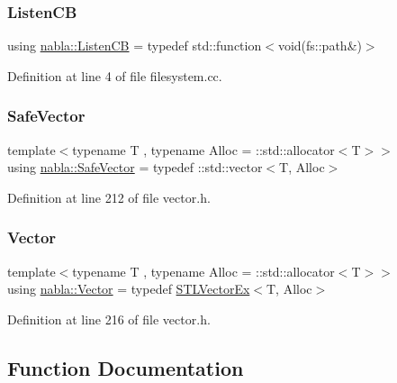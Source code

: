\subsubsection{\texorpdfstring{ListenCB}{ListenCB}}
{\footnotesize\ttfamily using \mbox{\hyperlink{namespacenabla_abd03676c495fab67cc7ac9b90e31c152}{nabla\+::\+Listen\+CB}} = typedef std\+::function$<$void(fs\+::path\&)$>$}



Definition at line 4 of file filesystem.\+cc.

\mbox{\label{namespacenabla_a2f96ae838f528e078f7bcdb42fbbe706}} 
\subsubsection{\texorpdfstring{SafeVector}{SafeVector}}
{\footnotesize\ttfamily template$<$typename T , typename Alloc  = \+::std\+::allocator$<$\+T$>$$>$ \\
using \mbox{\hyperlink{namespacenabla_a2f96ae838f528e078f7bcdb42fbbe706}{nabla\+::\+Safe\+Vector}} = typedef \+::std\+::vector$<$T, Alloc$>$}



Definition at line 212 of file vector.\+h.

\mbox{\label{namespacenabla_a34f7ca8c9af290f9af3ed299236ff959}} 
\subsubsection{\texorpdfstring{Vector}{Vector}}
{\footnotesize\ttfamily template$<$typename T , typename Alloc  = \+::std\+::allocator$<$\+T$>$$>$ \\
using \mbox{\hyperlink{namespacenabla_a34f7ca8c9af290f9af3ed299236ff959}{nabla\+::\+Vector}} = typedef \mbox{\hyperlink{classnabla_1_1_s_t_l_vector_ex}{S\+T\+L\+Vector\+Ex}}$<$T, Alloc$>$}



Definition at line 216 of file vector.\+h.



\subsection{Function Documentation}
\mbox{\label{namespacenabla_a76f6ec6bf96a20352e3fe6d075bfe137}} 
